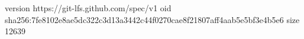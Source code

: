 version https://git-lfs.github.com/spec/v1
oid sha256:7fe8102e8ae5dc322c3d13a3442c44f0270cae8f21807aff4aab5e5bf3e4b5e6
size 12639
